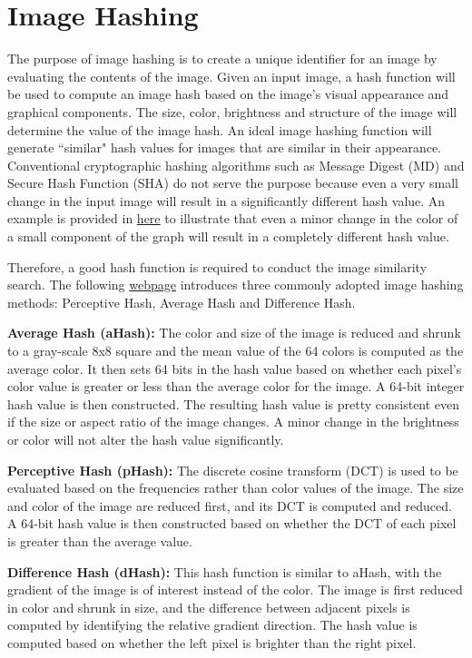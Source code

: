 \documentclass[letterpaper,12pt]{article}
\begin{document}
\section{Image Hashing}

The purpose of image hashing is to create a unique identifier for an image by evaluating the contents of the image. Given an input image, a hash function will be used to compute an image hash based on the image’s visual appearance and graphical components. The size, color, brightness and structure of the image will determine the value of the image hash. An ideal image hashing function will generate ``similar" hash values for images that are similar in their appearance. Conventional cryptographic hashing algorithms such as Message Digest (MD) and Secure Hash Function (SHA) do not serve the purpose because even a very small change in the input image will result in a significantly different hash value. An example is provided in \href{http://blog.iconfinder.com/detecting-duplicate-images-using-python/}{here} to illustrate that even a minor change in the color of a small component of the graph will result in a completely different hash value.

Therefore, a good hash function is required to conduct the image similarity search. The following \href{http://www.hackerfactor.com/blog/?/archives/529-Kind-of-Like-That.html}{webpage} introduces three commonly adopted image hashing methods: Perceptive Hash, Average Hash and Difference Hash.

\textbf{Average Hash (aHash): } The color and size of the image is reduced and shrunk to a gray-scale 8x8 square and the mean value of the 64 colors is computed as the average color. It then sets 64 bits in the hash value based on whether each pixel's color value is greater or less than the average color for the image. A 64-bit integer hash value is then constructed. The resulting hash value is pretty consistent even if the size or aspect ratio of the image changes. A minor change in the brightness or color will not alter the hash value significantly.

\textbf{Perceptive Hash (pHash): } The discrete cosine transform (DCT) is used to be evaluated based on the frequencies rather than color values of the image. The size and color of the image are reduced first, and its DCT is computed and reduced. A 64-bit hash value is then constructed based on whether the DCT of each pixel is greater than the average value.

\textbf{Difference Hash (dHash): } This hash function is similar to aHash, with the gradient of the image is of interest instead of the color. The image is first reduced in color and shrunk in size, and the difference between adjacent pixels is computed by identifying the relative gradient direction. The hash value is computed based on whether the left pixel is brighter than the right pixel. 
\end{document}
